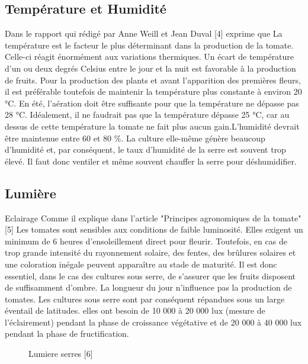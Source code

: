 \subsection{Température et Humidité}
Dans le rapport qui rédigé par Anne Weill et Jean Duval [4] exprime que 
La température est le facteur le plus déterminant dans la production de la tomate. Celle-ci
réagit énormément aux variations thermiques.
Un écart de température d’un ou deux degrés Celsius entre le jour et la nuit est favorable à
la production de fruits. Pour la production des plants et avant l’apparition des premières
fleurs, il est préférable toutefois de maintenir la température plus constante à environ
20 °C. En été, l’aération doit être suffisante pour que la température ne dépasse pas 28
°C. Idéalement, il ne faudrait pas que la température dépasse  25 °C, car au dessus de cette température la tomate ne fait plus aucun gain.L’humidité  devrait être
maintenue entre 60 et 80 \%. La culture elle-même génère beaucoup d’humidité et, par
conséquent, le taux d’humidité de la serre est souvent trop élevé. Il faut donc ventiler et
même souvent chauffer la serre pour déshumidifier.



\subsection{Lumière}
Eclairage
Comme il  explique dans l’article "Principes agronomiques de la tomate" [5]
Les tomates sont sensibles aux conditions de
faible luminosité. Elles exigent un minimum de 6 heures d’ensoleillement direct pour
fleurir. Toutefois, en cas de trop grande intensité du rayonnement solaire, des fentes, des
brûlures solaires et une coloration inégale peuvent apparaître au stade de maturité. Il est
donc essentiel, dans le cas des cultures sous serre, de s’assurer que les fruits disposent de
suffisamment d’ombre. La longueur du jour n’influence pas la production de tomates. Les
cultures sous serre sont par conséquent répandues sous un large éventail de latitudes.
elles ont besoin de 10 000 à 20 000 lux (mesure de l'éclairement) pendant la phase de croissance végétative et de 20 000 à 40 000 lux pendant la phase de fructification. 

\begin{center}
	\begin{figure}[!h]
\centering
	\label{fig:Lumiere serres}
		\caption{Lumiere serres [6]}
\end{figure}
\end{center}

